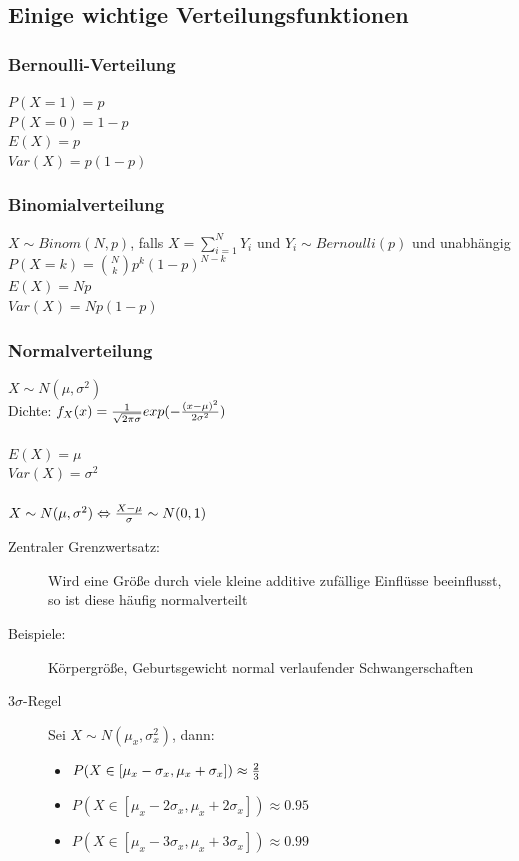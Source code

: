 \subsection{Einige wichtige Verteilungsfunktionen}

\subsubsection{Bernoulli-Verteilung}
$ P(X=1) = p $ \\
$ P(X=0) = 1-p $ \\
$ E(X) = p $ \\
$ Var(X) = p(1-p) $

\subsubsection{Binomialverteilung}
$ X \sim Binom(N,p) $, falls $ X= \sum_{i=1}^N Y_i $ und $Y_i \sim Bernoulli(p)$ und unabhängig \\
$ P(X=k) = \binom{N}{k} p^k (1-p)^{N-k} $ \\
$ E(X) = Np $ \\
$ Var(X) = Np(1-p) $

\subsubsection{Normalverteilung}
$ X \sim N(\mu,\sigma^2) $ \\
Dichte: $ f_X(x) = { 1 \over \sqrt{2 \pi \sigma} } exp(-{(x - \mu)^2 \over 2 \sigma^2}) $ \\\\
$ E(X) = \mu $ \\
$ Var(X) = \sigma^2 $\\\\
$ X \sim N(\mu,\sigma^2) \Leftrightarrow {X - \mu \over \sigma} \sim N(0,1) $
\begin{description}
    \item[Zentraler Grenzwertsatz:] Wird eine Größe durch viele kleine additive zufällige Einflüsse beeinflusst, so ist diese häufig normalverteilt
    \item[Beispiele:] Körpergröße, Geburtsgewicht normal verlaufender Schwangerschaften
    \item[3$\sigma$-Regel]
        Sei $ X \sim N(\mu_x, \sigma_x^2) $, dann:
        \begin{itemize}
            \item $ P(X \in [\mu_x - \sigma_x, \mu_x + \sigma_x]) \approx {2 \over 3} $
            \item $ P(X \in [\mu_x - 2 \sigma_x, \mu_x + 2 \sigma_x]) \approx 0.95 $
            \item $ P(X \in [\mu_x - 3 \sigma_x, \mu_x + 3 \sigma_x]) \approx 0.99 $
        \end{itemize}
\end{description}

